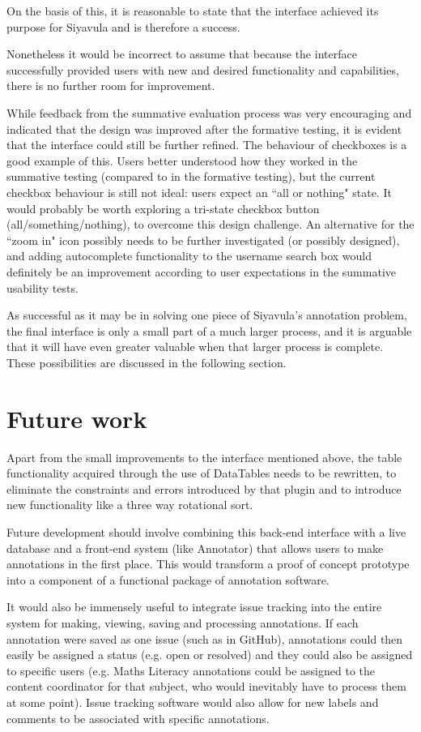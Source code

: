 On the basis of this, it is reasonable to state that the interface achieved its purpose for Siyavula and is therefore a success. 

Nonetheless it would be incorrect to assume that because the interface successfully provided users with new and desired functionality and capabilities, there is no further room for improvement. 

While feedback from the summative evaluation process was very encouraging and indicated that the design was improved after the formative testing, it is evident that the interface could still be further refined. The behaviour of checkboxes is a good example of this. Users better understood how they worked in the summative testing (compared to in the formative testing), but the current checkbox behaviour is still not ideal: users expect an ``all or nothing" state. It would probably be worth exploring a tri-state checkbox button (all/something/nothing), to overcome this design challenge. An alternative for the ``zoom in" icon possibly needs to be further investigated (or possibly designed), and adding autocomplete functionality to the username search box would definitely be an improvement according to user expectations in the summative usability tests.

As successful as it may be in solving one piece of Siyavula's annotation problem, the final interface is only a small part of a much larger process, and it is arguable that it will have even greater valuable when that larger process is complete. These possibilities are discussed in the following section. 

\section{Future work}
Apart from the small improvements to the interface mentioned above, the table functionality acquired through the use of DataTables needs to be rewritten, to eliminate the constraints and errors introduced by that plugin and to introduce new functionality like a three way rotational sort.

Future development should involve combining this back-end interface with a live database and a front-end system (like Annotator) that allows users to make annotations in the first place. This would transform a proof of concept prototype into a component of a functional package of annotation software.

It would also be immensely useful to integrate issue tracking into the entire system for making, viewing, saving and processing annotations. If each annotation were saved as one issue (such as in GitHub), annotations could then easily be assigned a status (e.g. open or resolved) and they could also be assigned to specific users (e.g. Maths Literacy annotations could be assigned to the content coordinator for that subject, who would inevitably have to process them at some point). Issue tracking software would also allow for new labels and comments to be associated with specific annotations. 

